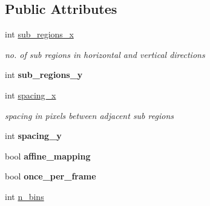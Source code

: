 \subsection*{Public Attributes}
\begin{DoxyCompactItemize}
\item 
\hypertarget{structLRSCVParams_a23df2105963b893015fe67af1b65ad9a}{int \hyperlink{structLRSCVParams_a23df2105963b893015fe67af1b65ad9a}{sub\-\_\-regions\-\_\-x}}\label{structLRSCVParams_a23df2105963b893015fe67af1b65ad9a}

\begin{DoxyCompactList}\small\item\em no. of sub regions in horizontal and vertical directions \end{DoxyCompactList}\item 
\hypertarget{structLRSCVParams_a13deafaa7ce4c5a44e859bf494805df2}{int {\bfseries sub\-\_\-regions\-\_\-y}}\label{structLRSCVParams_a13deafaa7ce4c5a44e859bf494805df2}

\item 
\hypertarget{structLRSCVParams_ab58a53853a644cfbef628b53b8dd09eb}{int \hyperlink{structLRSCVParams_ab58a53853a644cfbef628b53b8dd09eb}{spacing\-\_\-x}}\label{structLRSCVParams_ab58a53853a644cfbef628b53b8dd09eb}

\begin{DoxyCompactList}\small\item\em spacing in pixels between adjacent sub regions \end{DoxyCompactList}\item 
\hypertarget{structLRSCVParams_ab1ae36837e725859468bd1669b51b3d2}{int {\bfseries spacing\-\_\-y}}\label{structLRSCVParams_ab1ae36837e725859468bd1669b51b3d2}

\item 
\hypertarget{structLRSCVParams_a5ae23b1b9d6a5caaaea937e65d12e08b}{bool {\bfseries affine\-\_\-mapping}}\label{structLRSCVParams_a5ae23b1b9d6a5caaaea937e65d12e08b}

\item 
\hypertarget{structLRSCVParams_af7c2d98f9eacc9c1322ada05bd78d298}{bool {\bfseries once\-\_\-per\-\_\-frame}}\label{structLRSCVParams_af7c2d98f9eacc9c1322ada05bd78d298}

\item 
\hypertarget{structLRSCVParams_a0b19238d280c8c178d54ddc8f991286f}{int \hyperlink{structLRSCVParams_a0b19238d280c8c178d54ddc8f991286f}{n\-\_\-bins}}\label{structLRSCVParams_a0b19238d280c8c178d54ddc8f991286f}


\end{DoxyCompactItemize}
